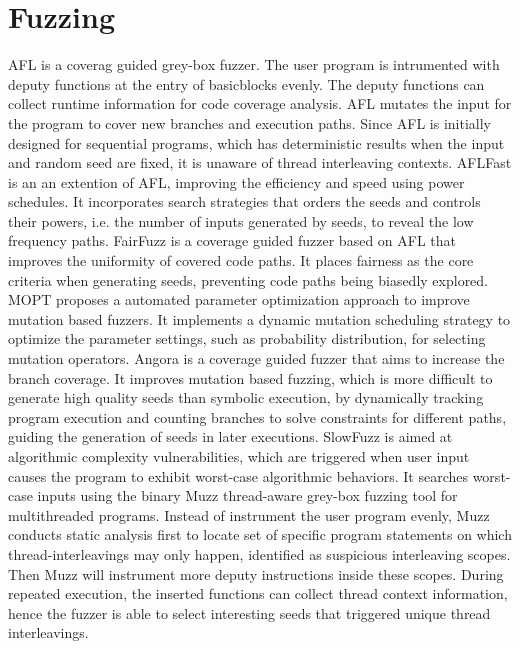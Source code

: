 \section{Fuzzing}

AFL\cite{afl} is a coverag guided grey-box fuzzer. The user program is intrumented with deputy functions at the entry of basicblocks evenly. The deputy functions can collect runtime information for code coverage analysis. AFL mutates the input for the program to cover new branches and execution paths. Since AFL is initially designed for sequential programs, which has deterministic results when the input and random seed are fixed, it is unaware of thread interleaving contexts.
AFLFast\cite{fuzz:aflfast} is an an extention of AFL, improving the efficiency and speed using power schedules. It incorporates search strategies that orders the seeds and controls their powers, i.e. the number of inputs generated by seeds, to reveal the low frequency paths.
FairFuzz\cite{fuzz:FairFuzz} is a coverage guided fuzzer based on AFL that improves the uniformity of covered code paths. It places fairness as the core criteria when generating seeds, preventing code paths being biasedly explored.
MOPT\cite{fuzz:MOPT} proposes a automated parameter optimization approach to improve mutation based fuzzers. It implements a dynamic mutation scheduling strategy to optimize the parameter settings, such as probability distribution, for selecting mutation operators.
Angora\cite{fuzz:Angora} is a coverage guided fuzzer that aims to increase the branch coverage. It improves mutation based fuzzing, which is more difficult to generate high quality seeds than symbolic execution, by dynamically tracking program execution and counting branches to solve constraints for different paths, guiding the generation of seeds in later executions.
SlowFuzz\cite{fuzz:SlowFuzz} is aimed at algorithmic complexity vulnerabilities, which are triggered when user input causes the program to exhibit worst-case algorithmic behaviors. It searches worst-case inputs using the binary
Muzz\cite{muzz} thread-aware grey-box fuzzing tool for multithreaded programs. Instead of instrument the user program evenly, Muzz conducts static analysis first to locate set of specific program statements on which thread-interleavings may only happen, identified as suspicious interleaving scopes. Then Muzz will instrument more deputy instructions inside these scopes. During repeated execution, the inserted functions can collect thread context information, hence the fuzzer is able to select interesting seeds that triggered unique thread interleavings.
